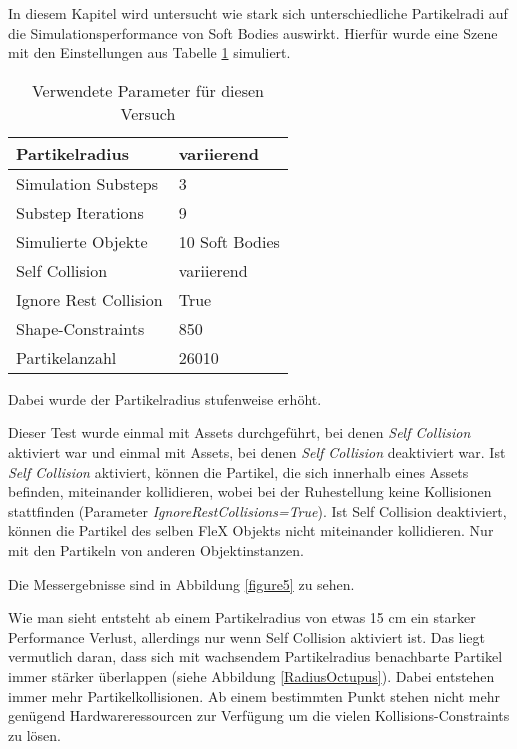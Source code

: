 In diesem Kapitel wird untersucht wie stark sich unterschiedliche Partikelradi auf die Simulationsperformance von Soft Bodies auswirkt. Hierfür wurde eine Szene mit den Einstellungen aus Tabelle \ref{table_self_collision} simuliert. 

\begin{table}[hbt!]
\centering
\caption{Verwendete Parameter für diesen Versuch}
\label{table_self_collision}
\begin{tabular}{l|l}
 \hline
Partikelradius & variierend  \\ \hline
Simulation Substeps & 3      \\ \hline
Substep Iterations & 9            \\ \hline
Simulierte Objekte &  10 Soft Bodies \\ \hline
Self Collision & variierend \\ \hline%
Ignore Rest Collision & True\\ \hline
Shape-Constraints & 850            \\ \hline
Partikelanzahl & 26010            \\ \hline
\end{tabular}
\end{table}

Dabei wurde der Partikelradius stufenweise erhöht. 


Dieser Test wurde einmal mit Assets durchgeführt, bei denen \textit{Self Collision} aktiviert war und einmal mit Assets, bei denen \textit{Self Collision} deaktiviert war. Ist \textit{Self Collision} aktiviert, können die Partikel, die sich innerhalb eines Assets befinden, miteinander kollidieren, wobei bei der Ruhestellung keine Kollisionen stattfinden (Parameter \textit{IgnoreRestCollisions=True}). Ist Self Collision deaktiviert, können die Partikel des selben FleX Objekts nicht miteinander kollidieren. Nur mit den Partikeln von anderen Objektinstanzen.

Die Messergebnisse sind in Abbildung \ref{figure5} zu sehen.


Wie man sieht entsteht ab einem Partikelradius von etwas 15 cm ein starker Performance Verlust, allerdings nur wenn Self Collision aktiviert ist. Das liegt vermutlich daran, dass sich mit wachsendem Partikelradius benachbarte Partikel immer stärker überlappen (siehe Abbildung \ref{RadiusOctupus}). Dabei entstehen immer mehr Partikelkollisionen. Ab einem bestimmten Punkt stehen nicht mehr genügend Hardwareressourcen zur Verfügung um die vielen Kollisions-Constraints zu lösen.

